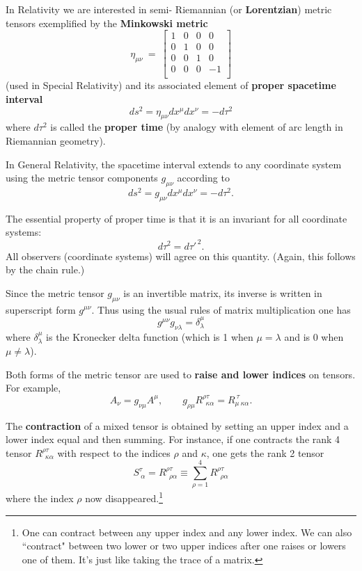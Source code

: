 \documentclass[12pt,reqno]{amsart}
\theoremstyle{definition}
\numberwithin{equation}{section}
\begin{document}
In Relativity we are interested in semi- Riemannian (or {\bf Lorentzian}) metric tensors exemplified by the {\bf Minkowski metric}
\begin{equation}\label{Mink}
\eta_{\mu\nu} \ = \ 
\begin{bmatrix}
1 & 0 & 0 & 0 \\
0 & 1 & 0 & 0 \\
0 & 0 & 1 & 0 \\
0 & 0 & 0 & -1 \\
\end{bmatrix}
\end{equation}
(used in Special Relativity) and its associated element of {\bf proper spacetime interval}
\[
ds^2 = \eta_{\mu\nu} dx^\mu dx^\nu = - d\tau^2
\]
where $d\tau^2$ is called the {\bf proper time} (by analogy with element of arc length in Riemannian geometry).

In General Relativity, the spacetime interval extends to any coordinate system using the metric tensor components $g_{\mu\nu}$ according to 
\[
ds^2 = g_{\mu\nu} dx^\mu dx^\nu = - d\tau^2.
\]

The essential property of proper time is that it is an invariant for all coordinate systems:
$$d\tau^2 = d\tau'^{\,2}.$$
All observers (coordinate systems) will agree on this quantity. (Again, this follows by the chain rule.)

\medskip

Since the metric tensor $g_{\mu\nu}$ is an invertible matrix, its inverse is written in superscript form $g^{\mu\nu}$. Thus using the usual rules of matrix multiplication one has
$$g^{\mu\nu} g_{\nu\lambda} = \delta^\mu_\lambda$$ 
where $\delta^\mu_\lambda$ is the Kronecker delta function (which is 1 when $\mu=\lambda$ and is 0 when $\mu\not=\lambda$). 

\medskip

Both forms of the metric tensor are used to {\bf raise and lower indices} on tensors. For example,
$$A_\nu = g_{\nu\mu} A^\mu, \qquad g_{\rho\mu} R^{\rho\tau}_{\ \ \kappa\alpha} = R^{\ \tau}_{\mu \ \kappa\alpha}.$$

The {\bf contraction} of a mixed tensor is obtained by setting an upper index and a lower index equal and then summing. For instance, if one contracts the rank 4 tensor $R^{\rho\tau}_{\ \ \kappa\alpha}$ with respect to the indices $\rho$ and $\kappa$, one gets the rank 2 tensor
\[
S^{\tau}_{\ \alpha} = R^{\rho\tau}_{\ \ \rho\alpha} 
\equiv \sum_{\rho=1}^4 R^{\rho\tau}_{\ \ \rho\alpha}
\] 
where the index $\rho$ now disappeared.\footnote{One can contract between any upper index and any lower index. We can also ``contract" between two lower or two upper indices after one raises or lowers one of them. It's just like taking the trace of a matrix.}
\end{document}
